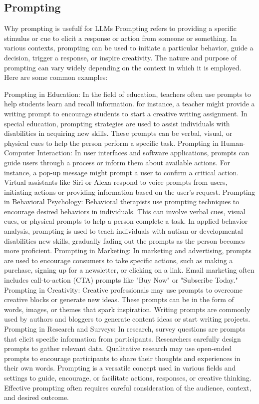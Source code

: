 \subsection{Prompting}
Why prompting is usefulf for LLMs
Prompting refers to providing a specific stimulus or cue to elicit a response or action from someone or something. In various contexts, prompting can be used to initiate a particular behavior, guide a decision, trigger a response, or inspire creativity. The nature and purpose of prompting can vary widely depending on the context in which it is employed. Here are some common examples:

Prompting in Education:
In the field of education, teachers often use prompts to help students learn and recall information. for instance, a teacher might provide a writing prompt to encourage students to start a creative writing assignment.
In special education, prompting strategies are used to assist individuals with disabilities in acquiring new skills. These prompts can be verbal, visual, or physical cues to help the person perform a specific task.
Prompting in Human-Computer Interaction:
In user interfaces and software applications, prompts can guide users through a process or inform them about available actions. For instance, a pop-up message might prompt a user to confirm a critical action.
Virtual assistants like Siri or Alexa respond to voice prompts from users, initiating actions or providing information based on the user's request.
Prompting in Behavioral Psychology:
Behavioral therapists use prompting techniques to encourage desired behaviors in individuals. This can involve verbal cues, visual cues, or physical prompts to help a person complete a task.
In applied behavior analysis, prompting is used to teach individuals with autism or developmental disabilities new skills, gradually fading out the prompts as the person becomes more proficient.
Prompting in Marketing:
In marketing and advertising, prompts are used to encourage consumers to take specific actions, such as making a purchase, signing up for a newsletter, or clicking on a link.
Email marketing often includes call-to-action (CTA) prompts like "Buy Now" or "Subscribe Today."
Prompting in Creativity:
Creative professionals may use prompts to overcome creative blocks or generate new ideas. These prompts can be in the form of words, images, or themes that spark inspiration.
Writing prompts are commonly used by authors and bloggers to generate content ideas or start writing projects.
Prompting in Research and Surveys:
In research, survey questions are prompts that elicit specific information from participants. Researchers carefully design prompts to gather relevant data.
Qualitative research may use open-ended prompts to encourage participants to share their thoughts and experiences in their own words.
Prompting is a versatile concept used in various fields and settings to guide, encourage, or facilitate actions, responses, or creative thinking. Effective prompting often requires careful consideration of the audience, context, and desired outcome.

